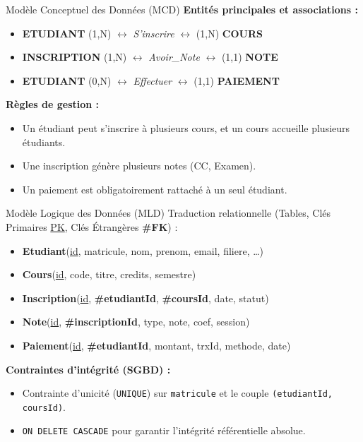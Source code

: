 \documentclass{beamer}
\begin{document}
\begin{frame}{Modèle Conceptuel des Données (MCD)}
    \textbf{Entités principales et associations :}
    \begin{itemize}
        \item \textbf{ETUDIANT} (1,N) $\longleftrightarrow$ \textit{S'inscrire} $\longleftrightarrow$ (1,N) \textbf{COURS}
        \item \textbf{INSCRIPTION} (1,N) $\longleftrightarrow$ \textit{Avoir\_Note} $\longleftrightarrow$ (1,1) \textbf{NOTE}
        \item \textbf{ETUDIANT} (0,N) $\longleftrightarrow$ \textit{Effectuer} $\longleftrightarrow$ (1,1) \textbf{PAIEMENT}
    \end{itemize}
    
    \vspace{0.3cm}
    \textbf{Règles de gestion :}
    \begin{itemize}
        \item Un étudiant peut s'inscrire à plusieurs cours, et un cours accueille plusieurs étudiants.
        \item Une inscription génère plusieurs notes (CC, Examen).
        \item Un paiement est obligatoirement rattaché à un seul étudiant.
    \end{itemize}
\end{frame}

\begin{frame}{Modèle Logique des Données (MLD)}
    Traduction relationnelle (Tables, Clés Primaires \underline{PK}, Clés Étrangères \textbf{\#FK}) :
    
    \begin{itemize}
        \item \textbf{Etudiant}(\underline{id}, matricule, nom, prenom, email, filiere, \dots)
        \item \textbf{Cours}(\underline{id}, code, titre, credits, semestre)
        \item \textbf{Inscription}(\underline{id}, \textbf{\#etudiantId}, \textbf{\#coursId}, date, statut)
        \item \textbf{Note}(\underline{id}, \textbf{\#inscriptionId}, type, note, coef, session)
        \item \textbf{Paiement}(\underline{id}, \textbf{\#etudiantId}, montant, trxId, methode, date)
    \end{itemize}
    
    \vspace{0.3cm}
    \textbf{Contraintes d'intégrité (SGBD) :} 
    \begin{itemize}
        \item Contrainte d'unicité (\texttt{UNIQUE}) sur \texttt{matricule} et le couple \texttt{(etudiantId, coursId)}.
        \item \texttt{ON DELETE CASCADE} pour garantir l'intégrité référentielle absolue.
    \end{itemize}
\end{frame}
\end{document}
